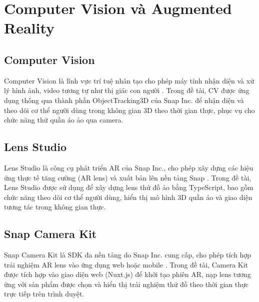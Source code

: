 \section{Computer Vision và Augmented Reality}

\subsection{Computer Vision}
Computer Vision là lĩnh vực trí tuệ nhân tạo cho phép máy 
tính nhận diện và xử lý hình ảnh, video tương tự như thị giác 
con người \cite{snap_body_tracking_docs}. Trong đề tài, CV được 
ứng dụng thông qua thành phần ObjectTracking3D của 
Snap Inc. để nhận diện và theo dõi cơ thể người dùng trong không 
gian 3D theo thời gian thực, phục vụ cho chức năng thử quần áo 
ảo qua camera.

\subsection{Lens Studio}
Lens Studio là công cụ phát triển AR của Snap Inc., cho phép xây 
dựng các hiệu ứng thực tế tăng cường (AR lens) và xuất bản lên 
nền tảng Snap \cite{lens_studio_docs}. Trong đề tài, Lens Studio 
được sử dụng để xây dựng lens thử đồ ảo bằng TypeScript, bao 
gồm chức năng theo dõi cơ thể người dùng, hiển thị mô hình 3D 
quần áo và giao diện tương tác trong không gian thực.

\subsection{Snap Camera Kit}
Snap Camera Kit là SDK đa nền tảng do Snap Inc. cung cấp, cho 
phép tích hợp trải nghiệm AR lens vào ứng dụng web hoặc mobile 
\cite{snap_camera_kit_docs}. Trong đề tài, Camera Kit được tích 
hợp vào giao diện web (Nuxt.js) để khởi tạo phiên AR, nạp lens 
tương ứng với sản phẩm được chọn và hiển thị trải nghiệm thử đồ 
theo thời gian thực trực tiếp trên trình duyệt.